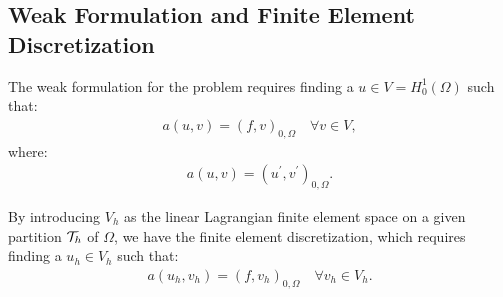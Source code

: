 \subsection{Weak Formulation and Finite Element Discretization} \label{fem_definition}

The weak formulation for the problem requires finding a $u \in V = H_0^1(\Omega)$ such that:
\begin{gather}
	a(u, v) = (f, v)_{0, \Omega} \quad \forall v \in V,
\end{gather}
where:
\begin{gather}
	a(u, v) = (u^{\prime}, v^{\prime})_{0, \Omega}.
\end{gather}

By introducing $V_h$ as the linear Lagrangian finite element space on a given partition $\mathcal{T}_h$ of $\Omega$, we have the finite element discretization, which requires finding a $u_h \in V_h$ such that:
\begin{gather}
	a(u_h, v_h) = (f, v_h)_{0, \Omega} \quad \forall v_h \in V_h.
\end{gather}